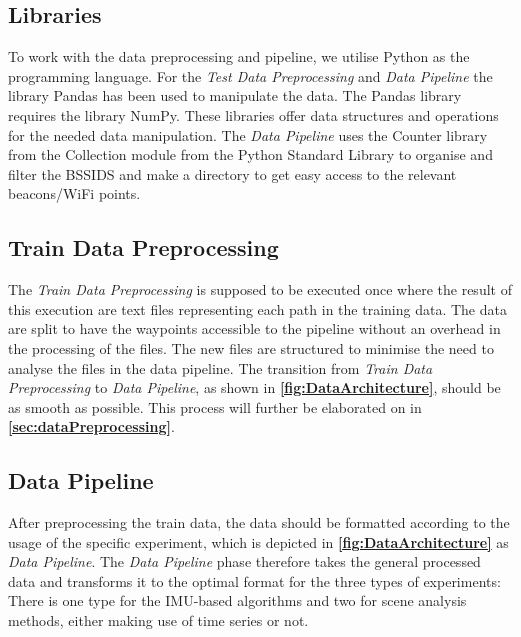 \subsection{Libraries}
To work with the data preprocessing and pipeline, we utilise Python as the programming language. For the \textit{Test Data Preprocessing} and \textit{Data Pipeline} the library Pandas\cite{pandas} has been used to manipulate the data. The Pandas library requires the library NumPy\cite{numpy}. These libraries offer data structures and operations for the needed data manipulation.
The \textit{Data Pipeline} uses the Counter library from the Collection module from the Python Standard Library to organise and filter the BSSIDS and make a directory to get easy access to the relevant beacons/WiFi points.

\subsection{Train Data Preprocessing}
The \textit{Train Data Preprocessing} is supposed to be executed once where the result of this execution are text files representing each path in the training data. The data are split to have the waypoints accessible to the pipeline without an overhead in the processing of the files. The new files are structured to minimise the need to analyse the files in the data pipeline. The transition from \textit{Train Data Preprocessing} to \textit{Data Pipeline}, as shown in \textbf{\autoref{fig:DataArchitecture}}, should be as smooth as possible. This process will further be elaborated on in \textbf{\autoref{sec:dataPreprocessing}}.

\subsection{Data Pipeline} \label{sec:datapipeline}
After preprocessing the train data, the data should be formatted according to the usage of the specific experiment, which is depicted in \textbf{\autoref{fig:DataArchitecture}} as \textit{Data Pipeline}. The \textit{Data Pipeline} phase therefore takes the general processed data and transforms it to the optimal format for the three types of experiments: There is one type for the IMU-based algorithms and two for scene analysis methods, either making use of time series or not.

